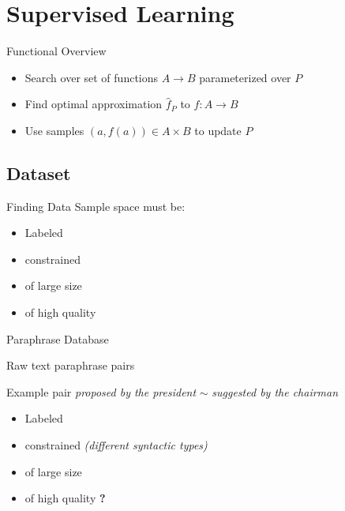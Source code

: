 \documentclass{beamer}
\newcommand{\xmark}{\ding{55}}
\begin{document}
	
\section{Supervised Learning}

\begin{frame}{Functional Overview}
	\begin{itemize}
	\item Search over set of functions $A \to B$ parameterized over $P$
	\item Find optimal approximation $\hat{f}_P$ to $f: A \to B$
	\item Use samples $(a, f(a)) \in A\times B$ to update $P$
	\end{itemize}	
\end{frame}

\subsection{Dataset} 

\begin{frame}{Finding Data}
	Sample space must be:
	\begin{itemize}
	\item Labeled
	\item constrained
	\item of large size
	\item of high quality
	\end{itemize}
\end{frame}

\begin{frame}{Paraphrase Database}

	Raw text paraphrase pairs
	
	
	\begin{block}{Example pair}
	\small \textit{proposed by the president} $\sim$ \textit{suggested by the chairman}
	\end{block}
	
	\begin{itemize}
	\item Labeled \textcolor{Yes}{\checkmark}
	\item constrained \textcolor{No}{\xmark}
	\footnotesize\textit{(different syntactic types)}
	\normalsize
	\item of large size \textcolor{Yes}{\checkmark}
	\item of high quality \textcolor{Maybe}{\textbf{?}}
	\end{itemize}
\end{frame}
\end{document}
